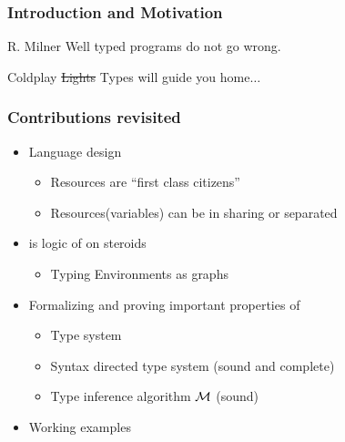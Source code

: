 \begin{frame}[c]
  \frametitle{Introduction and Motivation}
  \begin{center}
    \uncover<+-> {\LARGE
      \begin{aquote}{R. Milner}
        Well typed programs do not go wrong.
      \end{aquote}
    }
    \vspace{2cm}
    \uncover<+-> {\LARGE
      \begin{aquote}{Coldplay}
        \sout{Lights}{\color{red} Types} will guide you home$\dots$
      \end{aquote}
    }
  \end{center}
\end{frame}

\begin{frame}
  \frametitle{Contributions revisited}

  \begin{itemize}

  \item {\color{red}Language design}
    \begin{itemize}
    \item {\color{red}Resources are ``first class citizens''}
    \item {\color{red}Resources(variables) can be in sharing or separated}
    \end{itemize}

  \item {\color{red}\qub{} is logic of \BI on steroids}
    \begin{itemize}
    \item {\color{red}Typing Environments as graphs}
    \end{itemize}
  \item Formalizing and proving important properties of \qub{}
    \begin{itemize}
    \item Type system
    \item Syntax directed type system (sound and complete)
    \item Type inference algorithm $\mathcal{M}$ (sound)
    \end{itemize}
  \item {\color{red}Working examples}

  \end{itemize}

\end{frame}


